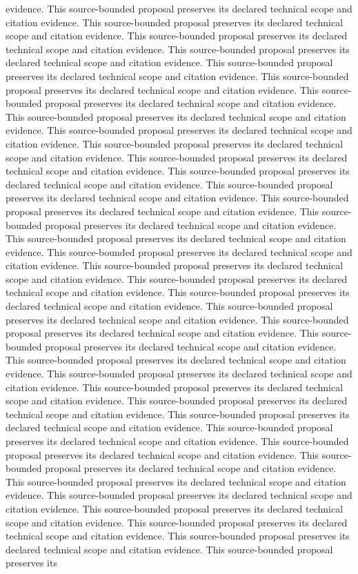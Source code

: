 \documentclass{article}
\begin{document}
evidence. This source-bounded proposal preserves its declared technical scope and citation evidence. This source-bounded proposal preserves its declared technical scope and citation evidence. This source-bounded proposal preserves its declared technical scope and citation evidence. This source-bounded proposal preserves its declared technical scope and citation evidence. This source-bounded proposal preserves its declared technical scope and citation evidence. This source-bounded proposal preserves its declared technical scope and citation evidence. This source-bounded proposal preserves its declared technical scope and citation evidence. This source-bounded proposal preserves its declared technical scope and citation evidence. This source-bounded proposal preserves its declared technical scope and citation evidence. This source-bounded proposal preserves its declared technical scope and citation evidence. This source-bounded proposal preserves its declared technical scope and citation evidence. This source-bounded proposal preserves its declared technical scope and citation evidence. This source-bounded proposal preserves its declared technical scope and citation evidence. This source-bounded proposal preserves its declared technical scope and citation evidence. This source-bounded proposal preserves its declared technical scope and citation evidence. This source-bounded proposal preserves its declared technical scope and citation evidence. This source-bounded proposal preserves its declared technical scope and citation evidence. This source-bounded proposal preserves its declared technical scope and citation evidence. This source-bounded proposal preserves its declared technical scope and citation evidence. This source-bounded proposal preserves its declared technical scope and citation evidence. This source-bounded proposal preserves its declared technical scope and citation evidence. This source-bounded proposal preserves its declared technical scope and citation evidence. This source-bounded proposal preserves its declared technical scope and citation evidence. This source-bounded proposal preserves its declared technical scope and citation evidence. This source-bounded proposal preserves its declared technical scope and citation evidence. This source-bounded proposal preserves its declared technical scope and citation evidence. This source-bounded proposal preserves its declared technical scope and citation evidence. This source-bounded proposal preserves its declared technical scope and citation evidence. This source-bounded proposal preserves its declared technical scope and citation evidence. This source-bounded proposal preserves its declared technical scope and citation evidence. This source-bounded proposal preserves its declared technical scope and citation evidence. This source-bounded proposal preserves its declared technical scope and citation evidence. This source-bounded proposal preserves its declared technical scope and citation evidence. This source-bounded proposal preserves its declared technical scope and citation evidence. This source-bounded proposal preserves its declared technical scope and citation evidence. This source-bounded proposal preserves its declared technical scope and citation evidence. This source-bounded proposal preserves its 
\end{document}
